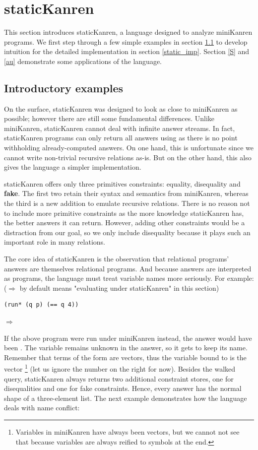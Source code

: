 \section{staticKanren}\label{static}
This section introduces staticKanren, a language designed to analyze miniKanren programs. We first step through a few simple examples in section \ref{static_intro} to develop intuition for the detailed implementation in section \ref{static_imp}. Section \ref{S} and \ref{au} demonstrate some applications of the language.

\subsection{Introductory examples}\label{static_intro}
On the surface, staticKanren was designed to look as close to miniKanren as possible; however there are still some fundamental differences. Unlike miniKanren, staticKanren cannot deal with infinite answer streams. In fact, staticKanren programs can only return all answers using  as there is no point withholding already-computed answers. On one hand, this is unfortunate since we cannot write non-trivial recursive relations as-is. But on the other hand, this also gives the language a simpler implementation.

staticKanren offers only three primitives constraints: equality, disequality and \textbf{fake}. The first two retain their syntax and semantics from miniKanren, whereas the third is a new addition to emulate recursive relations. There is no reason not to include more primitive constraints as the more knowledge staticKanren has, the better answers it can return. However, adding other constraints would be a distraction from our goal, so we only include disequality because it plays such an important role in many relations.

The core idea of staticKanren is the observation that relational programs' answers are themselves relational programs. And because answers are interpreted as programs, the language must treat variable names more seriously. For example: ($\Rightarrow$ by default means "evaluating under staticKanren" in this section)

\begin{lstlisting}
(run* (q p) (== q 4))
\end{lstlisting}
$\Rightarrow$ 

If the above program were run under miniKanren instead, the answer would have been . The variable  remains unknown in the answer, so it gets to keep its name. Remember that terms of the form  are vectors, thus the variable bound to  is the vector \footnote{Variables in miniKanren have always been vectors, but we cannot not see that because variables are always reified to symbols at the end.} (let us ignore the number on the right for now). Besides the walked query, staticKanren always returns two additional constraint stores, one for disequalities and one for fake constraints. Hence, every answer has the normal shape of a three-element list. The next example demonstrates how the language deals with name conflict:

